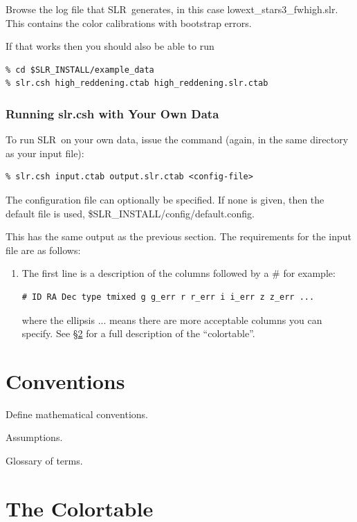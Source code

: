 \documentclass{report}
\newcommand{\slr}{SLR}
\begin{document}
Browse the log file that \slr\ generates, in this case
lowext\_stars3\_fwhigh.slr. This contains the color calibrations
with bootstrap errors.

If that works then you should also be able to run
\begin{verbatim}
% cd $SLR_INSTALL/example_data
% slr.csh high_reddening.ctab high_reddening.slr.ctab
\end{verbatim}


\subsection{Running slr.csh with Your Own Data}

To run \slr\ on your own data, issue the command (again, in the same
directory as your input file):
\begin{verbatim}
% slr.csh input.ctab output.slr.ctab <config-file>
\end{verbatim}
The configuration file can optionally be specified.  If none is given,
then the default file is used, \$SLR\_INSTALL/config/default.config.

This has the same output as the previous section.  The requirements
for the input file are as follows:

\begin{enumerate}

\item The first line is a description of the columns followed by a
  $\#$ for example:
\begin{verbatim}
# ID RA Dec type tmixed g g_err r r_err i i_err z z_err ...
\end{verbatim}
  where the ellipsis ... means there are more acceptable columns you
  can specify.  See \S\ref{sec:colortable} for a full description of
  the ``colortable''.
\end{enumerate}




\chapter{Conventions}

Define mathematical conventions.

Assumptions.

Glossary of terms.


\chapter{The Colortable}
\label{sec:colortable}
\end{document}
